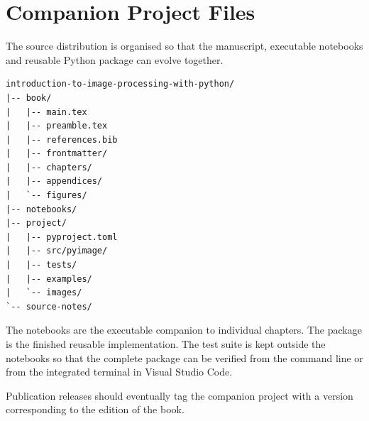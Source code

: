 \chapter*{Companion Project Files}

The source distribution is organised so that the manuscript, executable
notebooks and reusable Python package can evolve together.

\begin{verbatim}
introduction-to-image-processing-with-python/
|-- book/
|   |-- main.tex
|   |-- preamble.tex
|   |-- references.bib
|   |-- frontmatter/
|   |-- chapters/
|   |-- appendices/
|   `-- figures/
|-- notebooks/
|-- project/
|   |-- pyproject.toml
|   |-- src/pyimage/
|   |-- tests/
|   |-- examples/
|   `-- images/
`-- source-notes/
\end{verbatim}

The notebooks are the executable companion to individual chapters. The
\pyimage{} package is the finished reusable implementation. The test suite is
kept outside the notebooks so that the complete package can be verified from
the command line or from the integrated terminal in Visual Studio Code.

Publication releases should eventually tag the companion project with a
version corresponding to the edition of the book.
